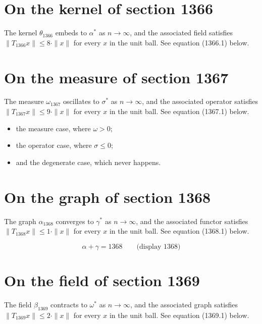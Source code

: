 \documentclass{article}
\begin{document}
\section{On the kernel of section 1366}
The kernel $\theta_{1366}$ embeds to $\alpha^{*}$ as $n \to \infty$,
and the associated field satisfies $\|T_{1366} x\| \leq 8 \cdot \|x\|$
for every $x$ in the unit ball. See equation (1366.1) below.

\section{On the measure of section 1367}
The measure $\omega_{1367}$ oscillates to $\sigma^{*}$ as $n \to \infty$,
and the associated operator satisfies $\|T_{1367} x\| \leq 9 \cdot \|x\|$
for every $x$ in the unit ball. See equation (1367.1) below.

\begin{itemize}
  \item the measure case, where $\omega > 0$;
  \item the operator case, where $\sigma \leq 0$;
  \item and the degenerate case, which never happens.
\end{itemize}

\section{On the graph of section 1368}
The graph $\alpha_{1368}$ converges to $\gamma^{*}$ as $n \to \infty$,
and the associated functor satisfies $\|T_{1368} x\| \leq 1 \cdot \|x\|$
for every $x$ in the unit ball. See equation (1368.1) below.

$$
\alpha + \gamma = 1368 \qquad \text{(display 1368)}
$$

\section{On the field of section 1369}
The field $\beta_{1369}$ contracts to $\omega^{*}$ as $n \to \infty$,
and the associated graph satisfies $\|T_{1369} x\| \leq 2 \cdot \|x\|$
for every $x$ in the unit ball. See equation (1369.1) below.
\end{document}

